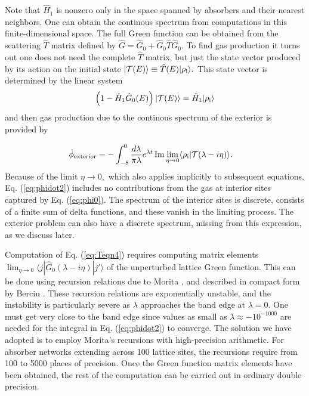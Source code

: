 \documentclass[english,notitlepage,twocolumn]{revtex4-1}
\def\ro{|\rho_{\rm i}\rangle}
\begin{document}
Note that $\hat{H}_{1}$ is nonzero only in the space spanned by absorbers
and their nearest neighbors. One can obtain the continous spectrum
from computations in this finite-dimensional space. The full Green
function can be obtained from the scattering $\hat{T}$ matrix defined
by $\hat{G}=\hat{G}_{0}+\hat{G}_{0}\hat{T}\hat{G}_{0}.$ To find gas
production it turns out one does not need the complete $\hat{T}$
matrix, but just the state vector produced by its action on the initial
state $|{\cal T}(E)\rangle\equiv\hat{T}(E)|\rho_{{\rm i}}\rangle.$
This state vector is determined by the linear system
\begin{equation}
\left(1-\hat{H}_{1}\hat{G}_{0}(E)\right)|{\cal T}(E)\rangle=\hat{H}_{1}\ro\label{eq:Teqn4}
\end{equation}
and then gas production due to the continous spectrum of the exterior
is provided by

\begin{align}
\dot{\phi}_{{\rm exterior}} & =-\int_{-8}^{0}\frac{d\lambda}{\pi\lambda}e^{\lambda t}\,\textrm{Im}\lim_{\eta\rightarrow0}\langle\rho_{{\rm i}}|{\cal T}(\lambda-i\eta)\rangle.\label{eq:phidot2}
\end{align}
Because of the limit $\eta\rightarrow0,$ which also applies implicitly
to subsequent equations, Eq. (\ref{eq:phidot2}) includes no contributions
from the gas at interior sites captured by Eq. (\ref{eq:phi0}). The
spectrum of the interior sites is discrete, consists of a finite sum
of delta functions, and these vanish in the limiting process. The
exterior problem can also have a discrete spectrum\cite{sutherland1986localization},
missing from this expression, as we discuss later.


 
Computation of Eq. (\ref{eq:Teqn4}) requires computing matrix elements
$\lim_{\eta\rightarrow0}\langle j|\hat{G}_{0}(\lambda-i\eta)|j'\rangle$
of the unperturbed lattice Green function. This can be done using
recursion relations due to Morita \cite{Morita.75}, and described
in compact form by Berciu \cite{Berciu.10}. These recursion relations
are exponentially unstable, and the instability is particularly severe
as $\lambda$ approaches the band edge at $\lambda=0$. One must get
very close to the band edge since values as small as $\lambda\approx-10^{-1000}$
are needed for the integral in Eq. (\ref{eq:phidot2}) to converge.
The solution we have adopted is to employ Morita's recursions with
high-precision arithmetic. For absorber networks extending across
100 lattice sites, the recursions require from 100 to 5000 places
of precision. Once the Green function matrix elements have been obtained,
the rest of the computation can be carried out in ordinary double
precision.
\end{document}
